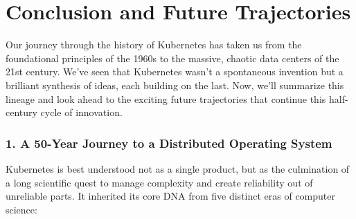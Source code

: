 \chapter{Conclusion and Future Trajectories}


Our journey through the history of Kubernetes has taken us from the foundational principles of the 1960s to the massive, chaotic data centers of the 21st century. We've seen that Kubernetes wasn't a spontaneous invention but a brilliant synthesis of ideas, each building on the last. Now, we'll summarize this lineage and look ahead to the exciting future trajectories that continue this half-century cycle of innovation.


\subsection{1. A 50-Year Journey to a Distributed Operating System}


Kubernetes is best understood not as a single product, but as the culmination of a long scientific quest to manage complexity and create reliability out of unreliable parts. It inherited its core DNA from five distinct eras of computer science:

